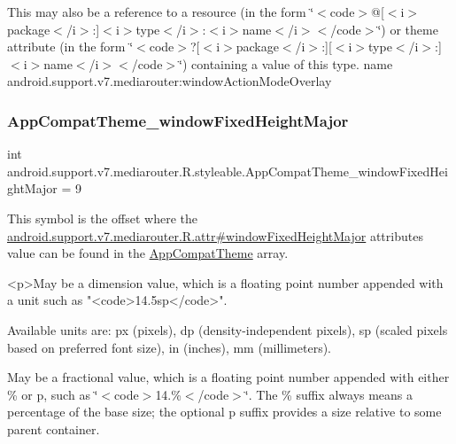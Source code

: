 This may also be a reference to a resource (in the form \char`\"{}$<$code$>$@\mbox{[}$<$i$>$package$<$/i$>$\+:\mbox{]}$<$i$>$type$<$/i$>$\+:$<$i$>$name$<$/i$>$$<$/code$>$\char`\"{}) or theme attribute (in the form \char`\"{}$<$code$>$?\mbox{[}$<$i$>$package$<$/i$>$\+:\mbox{]}\mbox{[}$<$i$>$type$<$/i$>$\+:\mbox{]}$<$i$>$name$<$/i$>$$<$/code$>$\char`\"{}) containing a value of this type.  name android.\+support.\+v7.\+mediarouter\+:window\+Action\+Mode\+Overlay \mbox{\label{classandroid_1_1support_1_1v7_1_1mediarouter_1_1R_1_1styleable_a7f07a96e9dd77caa12d1744db19f037d}} 
\subsubsection{\texorpdfstring{App\+Compat\+Theme\+\_\+window\+Fixed\+Height\+Major}{AppCompatTheme\_windowFixedHeightMajor}}
{\footnotesize\ttfamily int android.\+support.\+v7.\+mediarouter.\+R.\+styleable.\+App\+Compat\+Theme\+\_\+window\+Fixed\+Height\+Major = 9\hspace{0.3cm}{\ttfamily [static]}}

This symbol is the offset where the \hyperlink{classandroid_1_1support_1_1v7_1_1mediarouter_1_1R_1_1attr_ae94c6a494cc42532fa3c754e8ed28b40}{android.\+support.\+v7.\+mediarouter.\+R.\+attr\#window\+Fixed\+Height\+Major} attribute\textquotesingle{}s value can be found in the \hyperlink{classandroid_1_1support_1_1v7_1_1mediarouter_1_1R_1_1styleable_a4e3d3900c75d49aeb2f283cac00214d6}{App\+Compat\+Theme} array.

\begin{DoxyVerb}      <p>May be a dimension value, which is a floating point number appended with a unit such as "<code>14.5sp</code>".
\end{DoxyVerb}
 Available units are\+: px (pixels), dp (density-\/independent pixels), sp (scaled pixels based on preferred font size), in (inches), mm (millimeters). 

May be a fractional value, which is a floating point number appended with either \% or p, such as \char`\"{}$<$code$>$14.\%$<$/code$>$\char`\"{}. The \% suffix always means a percentage of the base size; the optional p suffix provides a size relative to some parent container. 

